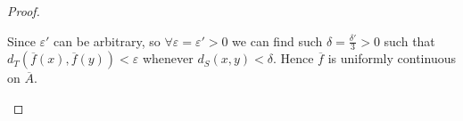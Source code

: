 \begin{proof}
\begin{itemize}
        Since $\varepsilon'$ can be arbitrary, so $\forall \varepsilon = \varepsilon' > 0$ we can find such $\delta = \tfrac{\delta'}{3} > 0$ such that $d_T(\overline{f}(x), \overline{f}(y)) < \varepsilon$ whenever $d_S(x,y) < \delta$. Hence $\overline{f}$ is uniformly continuous on $\overline{A}$.
        
    \end{itemize}
\end{proof}